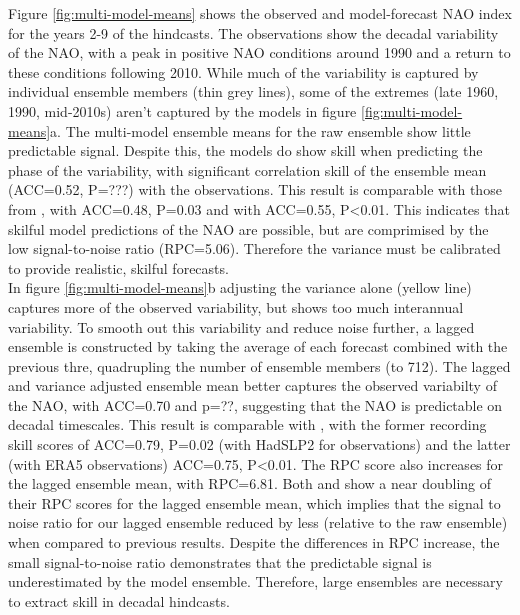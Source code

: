 \documentclass{article}
\begin{document}
Figure \ref{fig:multi-model-means} shows the observed and model-forecast NAO index for the years 2-9 of the hindcasts. The observations show the decadal variability of the NAO, with a peak in positive NAO conditions around 1990 and a return to these conditions following 2010. While much of the variability is captured by individual ensemble members (thin grey lines), some of the extremes (late 1960, 1990, mid-2010s) aren't captured by the models in figure \ref*{fig:multi-model-means}a. The multi-model ensemble means for the raw ensemble show little predictable signal. Despite this, the models do show skill when predicting the phase of the variability, with significant correlation skill of the ensemble mean (ACC=0.52, P=???) with the observations. This result is comparable with those from \cite{smith2020north}, with ACC=0.48, P=0.03 and \cite{marcheggiani2023decadal} with ACC=0.55, P<0.01. This indicates that skilful model predictions of the NAO are possible, but are comprimised by the low signal-to-noise ratio (RPC=5.06). Therefore the variance must be calibrated to provide realistic, skilful forecasts.\\

In figure \ref{fig:multi-model-means}b adjusting the variance alone (yellow line) captures more of the observed variability, but shows too much interannual variability. To smooth out this variability and reduce noise further, a lagged ensemble is constructed by taking the average of each forecast combined with the previous thre, quadrupling the number of ensemble members (to 712). The lagged and variance adjusted ensemble mean better captures the observed variabilty of the NAO, with ACC=0.70 and p=??, suggesting that the NAO is predictable on decadal timescales. This result is comparable with \cite{smith2020north,marcheggiani2023decadal}, with the former recording skill scores of ACC=0.79, P=0.02 (with HadSLP2 for observations) and the latter (with ERA5 observations) ACC=0.75, P<0.01. The RPC score also increases for the lagged ensemble mean, with RPC=6.81. Both \cite{smith2020north} and \cite{marcheggiani2023decadal} show a near doubling of their RPC scores for the lagged ensemble mean, which implies that the signal to noise ratio for our lagged ensemble reduced by less (relative to the raw ensemble) when compared to previous results. Despite the differences in RPC increase, the small signal-to-noise ratio demonstrates that the predictable signal is underestimated by the model ensemble. Therefore, large ensembles are necessary to extract skill in decadal hindcasts. 
\end{document}
